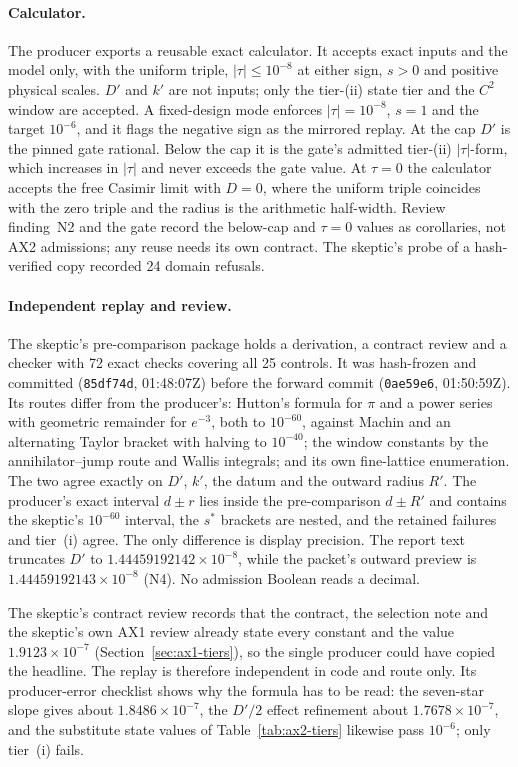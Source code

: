 \paragraph{Calculator.}
The producer exports a reusable exact calculator. It accepts exact inputs and
the model  only, with the uniform triple,
$|\tau|\le10^{-8}$ at either sign, $s>0$ and positive physical scales. $D'$ and
$k'$ are not inputs; only the tier-(ii) state tier and the $C^2$ window are
accepted. A fixed-design mode enforces $|\tau|=10^{-8}$, $s=1$ and the target
$10^{-6}$, and it flags the negative sign as the mirrored replay. At the cap
$D'$ is the pinned gate rational. Below the cap it is the gate's admitted
tier-(ii) $|\tau|$-form, which increases in $|\tau|$ and never exceeds the gate
value. At $\tau=0$ the calculator accepts the free Casimir limit with $D=0$,
where the uniform triple coincides with the zero triple and the radius is the
arithmetic half-width. Review finding~N2 and the gate record the below-cap and
$\tau=0$ values as corollaries, not AX2 admissions; any reuse needs its own
contract. The skeptic's probe of a hash-verified copy recorded 24 domain
refusals.

\paragraph{Independent replay and review.}
The skeptic's pre-comparison package holds a derivation, a contract review and
a checker with 72 exact checks covering all 25 controls. It was hash-frozen
and committed (\texttt{85df74d}, 01:48:07Z) before the forward commit
(\texttt{0ae59e6}, 01:50:59Z). Its routes differ from the producer's: Hutton's
formula for $\pi$ and a power series with geometric remainder for $e^{-3}$,
both to $10^{-60}$, against Machin and an alternating Taylor bracket with
halving to $10^{-40}$; the window constants by the annihilator--jump route and
Wallis integrals; and its own fine-lattice enumeration. The two agree exactly
on $D'$, $k'$, the datum and the outward radius $R'$. The producer's exact
interval $d\pm r$ lies inside the pre-comparison $d\pm R'$ and contains the
skeptic's $10^{-60}$ interval, the $s^*$ brackets are nested, and the retained
failures and tier~(i) agree. The only difference is display precision. The
report text truncates $D'$ to $1.44459192142\times10^{-8}$, while the
packet's outward preview is $1.44459192143\times10^{-8}$ (N4). No admission
Boolean reads a decimal.

The skeptic's contract review records that the contract, the selection note
and the skeptic's own AX1 review already state every constant and the value
$1.9123\times10^{-7}$ (Section~\ref{sec:ax1-tiers}), so the single producer
could have copied the headline. The replay is therefore independent in code
and route only. Its producer-error checklist shows why the formula has to be
read: the seven-star slope gives about $1.8486\times10^{-7}$, the $D'/2$
effect refinement about $1.7678\times10^{-7}$, and the substitute state values
of Table~\ref{tab:ax2-tiers} likewise pass $10^{-6}$; only tier~(i) fails.

